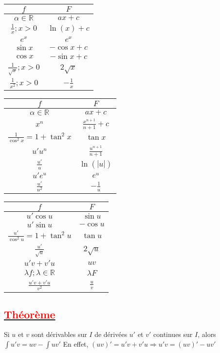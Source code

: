 \documentclass[12pt]{article}
\begin{document}
\begin{minipage}[t]{0.5\textwidth}
\centering
\begin{tabular}{|c|c|}
\hline
$f$ & $F$\\
\hline
$\alpha \in \mathbb{R}$ & $ax+c$\\
\hline
$\frac{1}{x};x>0$ & $\ln(x)+c$\\
\hline
$e^{x}$ & $e^{x}$\\
\hline
$\sin x$ & $-\cos x +c$\\
\hline
$\cos x$ & $-\sin x +c$\\
\hline
$\frac{1}{\sqrt{x}}; x>0$ & $2\sqrt{x}$\\
\hline
$\frac{1}{x^{2}}; x>0$ & $-\frac{1}{x}$\\
\hline
\end{tabular}
\end{minipage}%
\begin{minipage}[t]{0.5\textwidth}
\centering
\begin{tabular}{|c|c|}
\hline
$f$ & $F$\\
\hline
$\alpha \in \mathbb{R}$ & $ax+c$\\
\hline
$x^{n}$ & $\frac{x^{n+1}}{n+1}+c$\\
\hline
$\frac{1}{\cos^{2} x}=1+\tan^{2} x$ & $\tan x$\\
\hline
$u'u^{n}$ & $\frac{u^{n+1}}{n+1}$\\
\hline
$\frac{u'}{u}$ & $\ln(|u|)$\\
\hline
$u'e^{u}$ & $e^{u}$\\
\hline
$\frac{u'}{u^{2}}$ & $-\frac{1}{u}$\\
\hline
\end{tabular}
\end{minipage}

\begin{tabular}{|c|c|}
\hline
$f$ & $F$\\
\hline
$u'\cos u$ & $\sin u$\\
\hline
$u'\sin u$ & $-\cos u$\\
\hline
$\frac{u'}{\cos^{2} u}=1+\tan^{2} u$ & $\tan u$\\
\hline
$\frac{u'}{\sqrt{u}}$ & $2\sqrt{u}$\\
\hline
$u'v+v'u$ & $uv$\\
\hline
$\lambda f; \lambda \in \mathbb{R}$ & $\lambda F$\\
\hline
$\frac{u'v+v'u}{v^{2}}$ & $\frac{u}{v}$\\
\hline
\end{tabular}
\subsection*{\underline{\textbf{\textcolor{red}{Théorème }}}}
Si $u$ et $v$ sont dérivables sur $I$ de dérivées $u'$ et $v'$ continues sur $I$, alors
$\int u'v=uv-\int uv'$ En effet, $(uv)'=u'v+v'u \Longrightarrow u'v=(uv)'-uv'$
\end{document}
